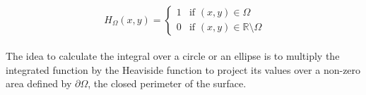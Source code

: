 \\
\begin{equation}
     \ H_{\Omega}(x,y) =
    \begin{cases}
        1 & \text{if } (x,y) \in \Omega\\
        0 & \text{if } (x,y) \in \mathbb{R}\setminus\Omega
    \end{cases}
\end{equation}
\\
\normalsize{The idea to calculate the integral over a circle or an ellipse is to multiply the integrated function by the Heaviside function to project its values over a non-zero area defined by $\partial \Omega$, the closed perimeter of the surface.}